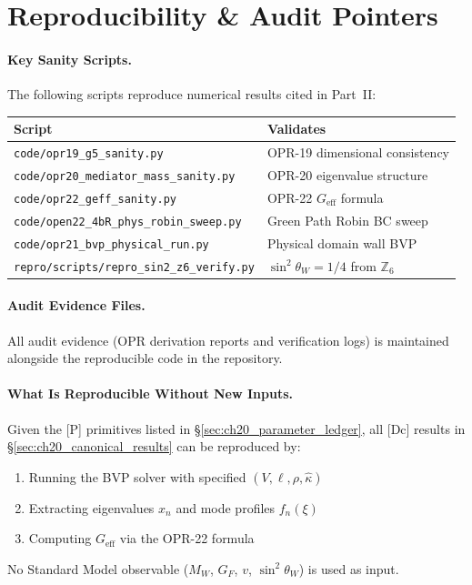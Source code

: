 
\section{Reproducibility \& Audit Pointers}
\label{sec:ch20_repro}

\paragraph{Key Sanity Scripts.}
The following scripts reproduce numerical results cited in Part~II:

\begin{center}
\renewcommand{\arraystretch}{1.3}
\begin{tabular}{lp{6cm}}
\toprule
\textbf{Script} & \textbf{Validates} \\
\midrule
\texttt{code/opr19\_g5\_sanity.py} & OPR-19 dimensional consistency \\
\texttt{code/opr20\_mediator\_mass\_sanity.py} & OPR-20 eigenvalue structure \\
\texttt{code/opr22\_geff\_sanity.py} & OPR-22 $G_{\text{eff}}$ formula \\
\texttt{code/open22\_4bR\_phys\_robin\_sweep.py} & Green Path Robin BC sweep \\
\texttt{code/opr21\_bvp\_physical\_run.py} & Physical domain wall BVP \\
\texttt{repro/scripts/repro\_sin2\_z6\_verify.py} & $\sin^2\theta_W = 1/4$ from $\mathbb{Z}_6$ \\
\bottomrule
\end{tabular}
\end{center}

\paragraph{Audit Evidence Files.}
All audit evidence (OPR derivation reports and verification logs) is maintained
alongside the reproducible code in the repository.

\paragraph{What Is Reproducible Without New Inputs.}
Given the [P] primitives listed in \S\ref{sec:ch20_parameter_ledger}, all [Dc] results
in \S\ref{sec:ch20_canonical_results} can be reproduced by:
\begin{enumerate}[nosep]
    \item Running the BVP solver with specified $(V, \ell, \rho, \hat\kappa)$
    \item Extracting eigenvalues $x_n$ and mode profiles $f_n(\xi)$
    \item Computing $G_{\text{eff}}$ via the OPR-22 formula
\end{enumerate}
No Standard Model observable ($M_W$, $G_F$, $v$, $\sin^2\theta_W$) is used as input.

